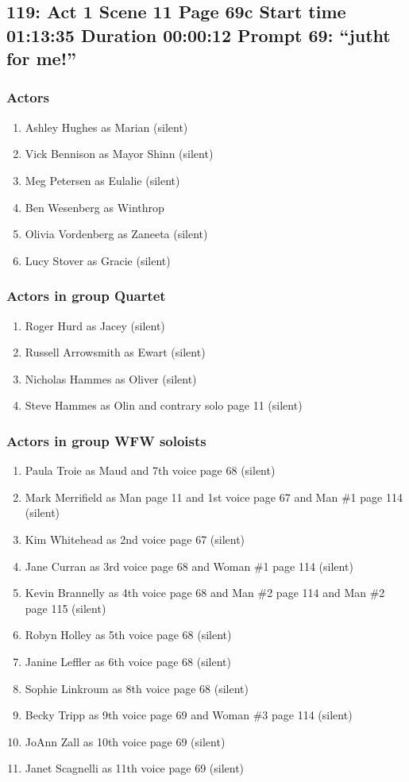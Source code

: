 \subsection{119: Act 1 Scene 11 Page 69c Start time 01:13:35 Duration 00:00:12 Prompt 69: ``jutht for me!''}

\subsubsection{Actors}
\begin{enumerate}
\item Ashley Hughes as Marian (silent)
\item Vick Bennison as Mayor Shinn (silent)
\item Meg Petersen as Eulalie (silent)
\item Ben Wesenberg as Winthrop
\item Olivia Vordenberg as Zaneeta (silent)
\item Lucy Stover as Gracie (silent)
\end{enumerate}
\subsubsection{Actors in group Quartet}
\begin{enumerate}
\item Roger Hurd as Jacey (silent)
\item Russell Arrowsmith as Ewart (silent)
\item Nicholas Hammes as Oliver (silent)
\item Steve Hammes as Olin and contrary solo page 11 (silent)
\end{enumerate}
\subsubsection{Actors in group WFW soloists}
\begin{enumerate}
\item Paula Troie as Maud and 7th voice page 68 (silent)
\item Mark Merrifield as Man page 11 and 1st voice page 67 and Man \#1 page 114 (silent)
\item Kim Whitehead as 2nd voice page 67 (silent)
\item Jane Curran as 3rd voice page 68 and Woman \#1 page 114 (silent)
\item Kevin Brannelly as 4th voice page 68 and Man \#2 page 114 and Man \#2 page 115 (silent)
\item Robyn Holley as 5th voice page 68 (silent)
\item Janine Leffler as 6th voice page 68 (silent)
\item Sophie Linkroum as 8th voice page 68 (silent)
\item Becky Tripp as 9th voice page 69 and Woman \#3 page 114 (silent)
\item JoAnn Zall as 10th voice page 69 (silent)
\item Janet Scagnelli as 11th voice page 69 (silent)
\end{enumerate}

